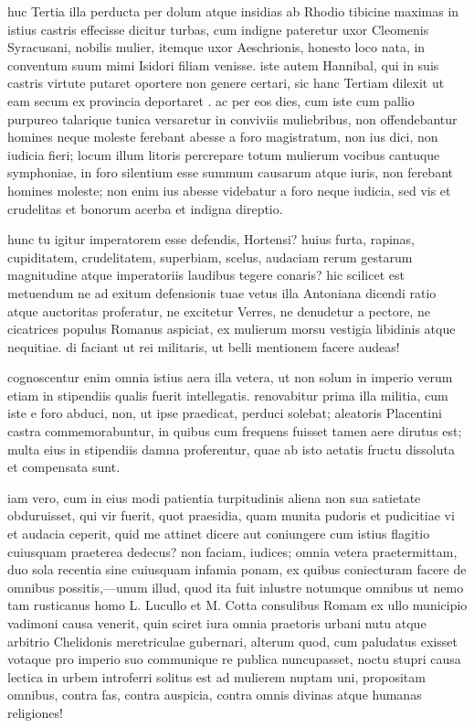  huc Tertia illa perducta per dolum atque insidias ab Rhodio tibicine maximas in istius castris effecisse dicitur turbas, cum indigne pateretur uxor Cleomenis Syracusani, nobilis mulier, itemque uxor Aeschrionis, honesto loco nata, in conventum suum mimi Isidori filiam venisse. iste autem Hannibal, qui in suis castris virtute putaret oportere non genere certari, sic hanc Tertiam dilexit ut eam secum ex provincia deportaret . ac per eos dies, cum iste cum pallio purpureo talarique tunica versaretur in conviviis muliebribus, non offendebantur homines neque moleste ferebant abesse a foro magistratum, non ius dici, non iudicia fieri; locum illum litoris percrepare totum mulierum vocibus cantuque symphoniae, in foro silentium esse summum causarum atque iuris, non ferebant homines moleste; non enim ius abesse videbatur a foro neque iudicia, sed vis et crudelitas et bonorum acerba et indigna direptio.

 hunc tu igitur imperatorem esse defendis, Hortensi? huius furta, rapinas, cupiditatem, crudelitatem, superbiam, scelus, audaciam rerum gestarum magnitudine atque imperatoriis laudibus tegere conaris? hic scilicet est metuendum ne ad exitum defensionis tuae vetus illa Antoniana dicendi ratio atque auctoritas proferatur, ne excitetur Verres, ne denudetur a pectore, ne cicatrices populus Romanus aspiciat, ex mulierum morsu vestigia libidinis atque nequitiae. di faciant ut rei militaris, ut belli mentionem facere audeas!

 cognoscentur enim omnia istius aera illa vetera, ut non solum in imperio verum etiam in stipendiis qualis fuerit intellegatis. renovabitur prima illa militia, cum iste e foro abduci, non, ut ipse praedicat, perduci solebat; aleatoris Placentini castra commemorabuntur, in quibus cum frequens fuisset tamen aere dirutus est; multa eius in stipendiis damna proferentur, quae ab isto aetatis fructu dissoluta et compensata sunt.

 iam vero, cum in eius modi patientia turpitudinis aliena non sua satietate obduruisset, qui vir fuerit, quot praesidia, quam munita pudoris et pudicitiae vi et audacia ceperit, quid me attinet dicere aut coniungere cum istius flagitio cuiusquam praeterea dedecus? non faciam, iudices; omnia vetera praetermittam, duo sola recentia sine cuiusquam infamia ponam, ex quibus coniecturam facere de omnibus possitis,—unum illud, quod ita fuit inlustre notumque omnibus ut nemo tam rusticanus homo L. Lucullo et M. Cotta consulibus Romam ex ullo municipio vadimoni causa venerit, quin sciret iura omnia praetoris urbani nutu atque arbitrio Chelidonis meretriculae gubernari, alterum quod, cum paludatus exisset votaque pro imperio suo communique re publica nuncupasset, noctu stupri causa lectica in urbem introferri solitus est ad mulierem nuptam uni, propositam omnibus, contra fas, contra auspicia, contra omnis divinas atque humanas religiones!

